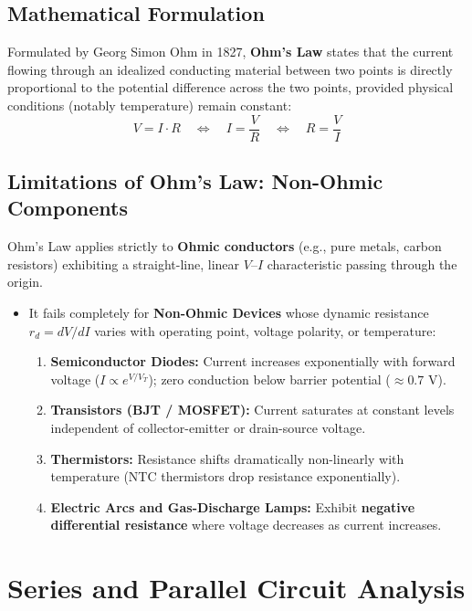 \subsection{Mathematical Formulation}
Formulated by Georg Simon Ohm in 1827, \textbf{Ohm's Law} states that the current flowing through an idealized conducting material between two points is directly proportional to the potential difference across the two points, provided physical conditions (notably temperature) remain constant:
\begin{equation}
\label{eq:ohms_law}
\boxed{V = I \cdot R \quad \Longleftrightarrow \quad I = \frac{V}{R} \quad \Longleftrightarrow \quad R = \frac{V}{I}}
\end{equation}

\subsection{Limitations of Ohm's Law: Non-Ohmic Components}
Ohm's Law applies strictly to \textbf{Ohmic conductors} (e.g., pure metals, carbon resistors) exhibiting a straight-line, linear $V$--$I$ characteristic passing through the origin.
\begin{itemize}
    \item It fails completely for \textbf{Non-Ohmic Devices} whose dynamic resistance $r_d = dV/dI$ varies with operating point, voltage polarity, or temperature:
    \begin{enumerate}[label=\bfseries\alph*.]
        \item \textbf{Semiconductor Diodes:} Current increases exponentially with forward voltage ($I \propto e^{V/V_T}$); zero conduction below barrier potential ($\approx 0.7\text{ V}$).
        \item \textbf{Transistors (BJT / MOSFET):} Current saturates at constant levels independent of collector-emitter or drain-source voltage.
        \item \textbf{Thermistors:} Resistance shifts dramatically non-linearly with temperature (NTC thermistors drop resistance exponentially).
        \item \textbf{Electric Arcs and Gas-Discharge Lamps:} Exhibit \textbf{negative differential resistance} where voltage decreases as current increases.
    \end{enumerate}
\end{itemize}


\section{Series and Parallel Circuit Analysis}
\label{sec:series_parallel}

